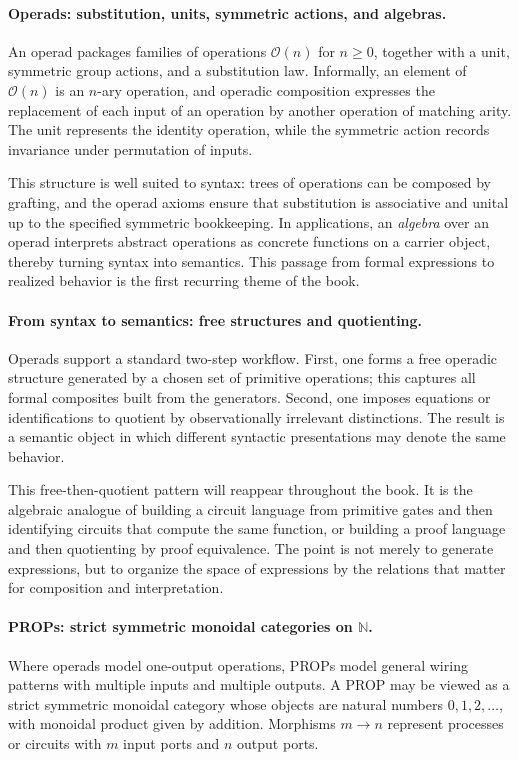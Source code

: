 \documentclass[11pt]{article}
\begin{document}
\paragraph{Operads: substitution, units, symmetric actions, and algebras.}
An operad packages families of operations \(\mathcal{O}(n)\) for \(n \ge 0\), together with a unit, symmetric group actions, and a substitution law. Informally, an element of \(\mathcal{O}(n)\) is an \(n\)-ary operation, and operadic composition expresses the replacement of each input of an operation by another operation of matching arity. The unit represents the identity operation, while the symmetric action records invariance under permutation of inputs.

This structure is well suited to syntax: trees of operations can be composed by grafting, and the operad axioms ensure that substitution is associative and unital up to the specified symmetric bookkeeping. In applications, an \emph{algebra} over an operad interprets abstract operations as concrete functions on a carrier object, thereby turning syntax into semantics. This passage from formal expressions to realized behavior is the first recurring theme of the book.

\paragraph{From syntax to semantics: free structures and quotienting.}
Operads support a standard two-step workflow. First, one forms a free operadic structure generated by a chosen set of primitive operations; this captures all formal composites built from the generators. Second, one imposes equations or identifications to quotient by observationally irrelevant distinctions. The result is a semantic object in which different syntactic presentations may denote the same behavior.

This free-then-quotient pattern will reappear throughout the book. It is the algebraic analogue of building a circuit language from primitive gates and then identifying circuits that compute the same function, or building a proof language and then quotienting by proof equivalence. The point is not merely to generate expressions, but to organize the space of expressions by the relations that matter for composition and interpretation.

\paragraph{PROPs: strict symmetric monoidal categories on \(\mathbb{N}\).}
Where operads model one-output operations, PROPs model general wiring patterns with multiple inputs and multiple outputs. A PROP may be viewed as a strict symmetric monoidal category whose objects are natural numbers \(0,1,2,\dots\), with monoidal product given by addition. Morphisms \(m \to n\) represent processes or circuits with \(m\) input ports and \(n\) output ports.
\end{document}
